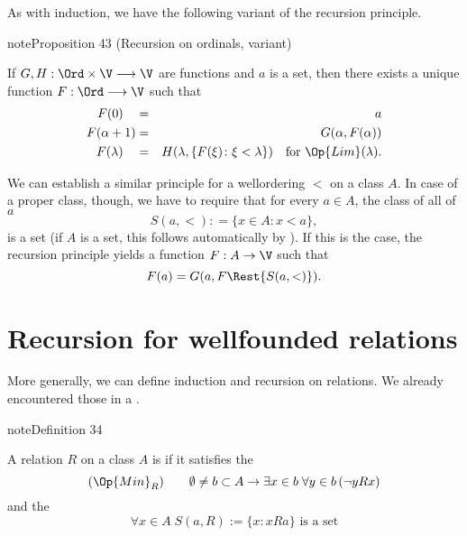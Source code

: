 \documentclass[letterpaper,10pt,english]{jupyterBook}
\begin{document}
\sphinxAtStartPar
As with induction, we have the following variant of the recursion principle.
\label{recursion:prop-ordinal-recursion-ii}
\begin{sphinxadmonition}{note}{Proposition 43 (Recursion on ordinals, variant)}



\sphinxAtStartPar
If \(G, H: \Ord \times \V \longrightarrow  \V\) are functions and \(a\) is a set, then there exists a unique function \(F: \Ord \longrightarrow \V\)  such that
\begin{eqnarray*} 
    F(0) \quad & = & a\\ 
    F(\alpha+1) & = & G(\alpha,F(\alpha)) \\    
    F(\lambda) \quad & = & H(\lambda, \{F(\xi) \colon \xi<\lambda \}) \quad \text{for } \Op{Lim}(\lambda).
\end{eqnarray*}\end{sphinxadmonition}

\sphinxAtStartPar
We can establish a similar principle for a well\sphinxhyphen{}ordering \(<\) on a class \(A\). In case of a proper class, though, we have to require that for every \(a \in A\),  the class of all  of \(a\)
\begin{equation*}
S(a,<): = \{x \in A\colon x < a \},
\end{equation*}
\sphinxAtStartPar
is a set (if \(A\) is a set, this follows automatically by ). If this is the case, the recursion principle yields a function \(F: A \to \V\) such that
\begin{equation*}
    F(a) = G(a,F\Rest{S(a,<)}).
\end{equation*}

\section{Recursion for well\sphinxhyphen{}founded relations}
\label{\detokenize{recursion:recursion-for-well-founded-relations}}
\sphinxAtStartPar
More generally, we can define induction and recursion on  relations. We already encountered those in a {\hyperref[\detokenize{coanalytic:sec-well-founded}]{}}.
\label{recursion:def-well-founded}
\begin{sphinxadmonition}{note}{Definition 34}



\sphinxAtStartPar
A relation \(R\) on a class \(A\) is  if it satisfies the 
\begin{equation*}
    (\Op{Min}_R) \qquad  \emptyset \neq b \subset A \to \exists x \in b \; \forall y \in b \, (  \neg y R x)
\end{equation*}
\sphinxAtStartPar
and the 
\begin{equation*} 
    \forall x \in A \; S(a,R):= \{x \colon x R a\} \text{ is a set}
\end{equation*}\end{sphinxadmonition}
\end{document}
